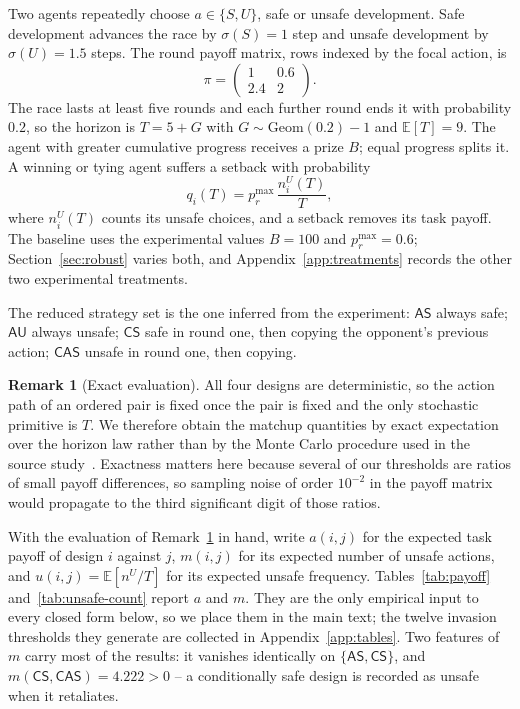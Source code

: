 \documentclass[11pt,a4paper]{article}
\theoremstyle{definition}
\newtheorem{remark}[theorem]{Remark}
\newcommand{\AS}{\textsf{AS}}
\newcommand{\AU}{\textsf{AU}}
\newcommand{\CS}{\textsf{CS}}
\newcommand{\CAS}{\textsf{CAS}}
\begin{document}
Two agents repeatedly choose $a\in\{S,U\}$, safe or unsafe development. Safe
development advances the race by $\sigma(S)=1$ step and unsafe development by
$\sigma(U)=1.5$ steps. The round payoff matrix, rows indexed by the focal
action, is
\begin{equation}
\pi=\begin{pmatrix} 1 & 0.6\\ 2.4 & 2\end{pmatrix}.
\label{eq:stage}
\end{equation}
The race lasts at least five rounds and each further round ends it with
probability $0.2$, so the horizon is $T=5+G$ with $G\sim\mathrm{Geom}(0.2)-1$
and $\mathbb{E}[T]=9$. The agent with greater cumulative progress receives a
prize $B$; equal progress splits it. A winning or tying agent suffers a
setback with probability
\begin{equation}
q_i(T)=p_r^{\max}\,\frac{n_i^{U}(T)}{T},
\label{eq:risk}
\end{equation}
where $n^{U}_i(T)$ counts its unsafe choices, and a setback removes its task
payoff. The baseline uses the experimental values $B=100$ and
$p_r^{\max}=0.6$; Section~\ref{sec:robust} varies both, and
Appendix~\ref{app:treatments} records the other two experimental treatments.

The reduced strategy set is the one inferred from the experiment: $\AS$ always
safe; $\AU$ always unsafe; $\CS$ safe in round one, then copying the
opponent's previous action; $\CAS$ unsafe in round one, then copying.

\begin{remark}[Exact evaluation]\label{rem:exact}
All four designs are deterministic, so the action path of an ordered pair is
fixed once the pair is fixed and the only stochastic primitive is $T$. We
therefore obtain the matchup quantities by exact expectation over the horizon
law rather than by the Monte Carlo procedure used in the source study~\citep{domingos2026falling}. Exactness matters here because several of our
thresholds are ratios of small payoff differences, so sampling noise of order
$10^{-2}$ in the payoff matrix would propagate to the third significant digit
of those ratios.
\end{remark}

With the evaluation of Remark~\ref{rem:exact} in hand, write $a(i,j)$ for the
expected task payoff of design $i$ against $j$,
$m(i,j)$ for its expected number of unsafe actions, and
$u(i,j)=\mathbb{E}[n^{U}/T]$ for its expected unsafe frequency.
Tables~\ref{tab:payoff} and~\ref{tab:unsafe-count} report $a$ and $m$. They
are the only empirical input to every closed form below, so we place them in
the main text; the twelve invasion thresholds they generate are collected in
Appendix~\ref{app:tables}. Two features of $m$ carry most of the results: it
vanishes identically on $\{\AS,\CS\}$, and $m(\CS,\CAS)=4.222>0$ -- a
conditionally safe design is recorded as unsafe when it retaliates.
\end{document}
